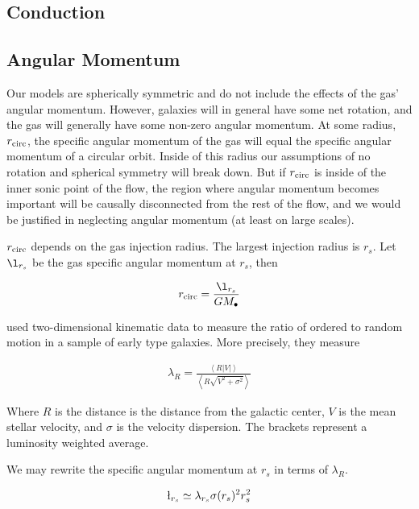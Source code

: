 \documentclass[usenatbib,fleqn]{mn2e}
\newcommand{\rs}{r_s}
\newcommand{\rcirc}{r_{\rm circ}}
\newcommand{\lrs}{\l_{\rs}}
\newcommand{\lambdars}{\lambda_{\rs}}
\newcommand{\Mbh}[1][]{M_{\bullet#1}}
\begin{document}
\subsection{Conduction}
\label{sec:conduction}{

  \subsection{Angular Momentum}
  \label{sec:ang}
  Our models are spherically symmetric and do not include the effects of
  the gas' angular momentum. However, galaxies will in general have some
  net rotation, and the gas will generally have some non-zero angular
  momentum. At some radius, $\rcirc$, the specific angular momentum of
  the gas will equal the specific angular momentum of a circular
  orbit. Inside of this radius our assumptions of no rotation and
  spherical symmetry will break down. But if $\rcirc$ is inside of the
  inner sonic point of the flow, the region where angular momentum
  becomes important will be causally disconnected from the rest of the
  flow, and we would be justified in neglecting angular momentum (at
  least on large scales).

  $\rcirc$ depends on the gas injection radius. The largest
  injection radius is $\rs$. Let $\lrs$ be the gas specific angular
  momentum at $\rs$, then 

  \begin{align}
    \rcirc=\frac{\lrs}{G \Mbh}
  \end{align}

  \citealt{EmsellemCappellari+:2007a} used two-dimensional kinematic
  data to measure the ratio of ordered to random motion in a sample of
  early type galaxies. More precisely, they measure

  \begin{align}
    \lambda_R=\frac{\left<R|V|\right>}{\left<R\sqrt{V^2+\sigma^2}\right>}
  \end{align}

  Where $R$ is the distance is the distance from the galactic center, $V$ is
  the mean stellar velocity, and $\sigma$ is the velocity
  dispersion. The brackets represent a luminosity weighted average.

  We may rewrite the specific angular momentum at $\rs$ in terms of $\lambda_R$.

  \begin{align}
    \lrs\simeq\lambdars \sigma(\rs)^2 \rs^2
  \end{align}

}
\end{document}
